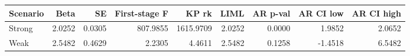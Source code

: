 \begin{tabular}{lrrrrrrrr}
\toprule
Scenario & Beta & SE & First-stage F & KP rk & LIML & AR p-val & AR CI low & AR CI high \\
\midrule
Strong & 2.0252 & 0.0305 & 807.9855 & 1615.9709 & 2.0252 & 0.0000 & 1.9852 & 2.0652 \\
Weak & 2.5482 & 0.4629 & 2.2305 & 4.4611 & 2.5482 & 0.1258 & -1.4518 & 6.5482 \\
\bottomrule
\end{tabular}

